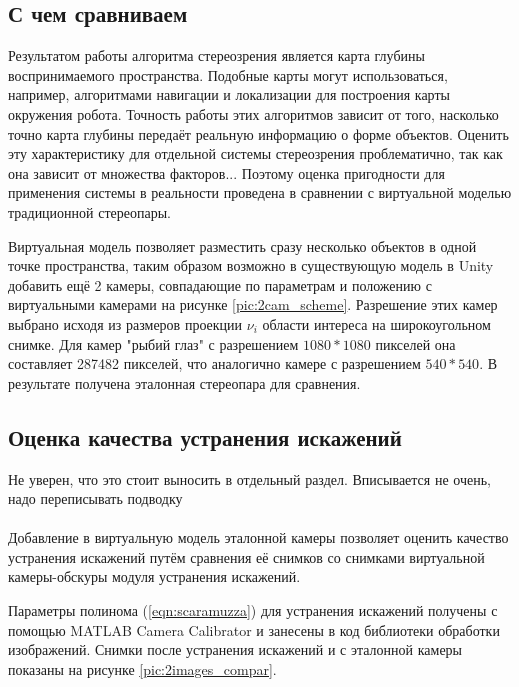 
\subsection{С чем сравниваем}  %

Результатом работы алгоритма стереозрения является карта глубины воспринимаемого пространства. Подобные карты могут
использоваться, например, алгоритмами навигации и локализации для построения карты окружения робота. Точность работы 
этих алгоритмов зависит от того, насколько точно карта глубины передаёт реальную информацию о форме объектов. Оценить 
эту характеристику для отдельной системы стереозрения проблематично, так как она зависит от множества факторов...
Поэтому оценка пригодности для применения системы в реальности проведена в сравнении с виртуальной моделью традиционной
стереопары.

Виртуальная модель позволяет разместить сразу несколько объектов в одной точке пространства, таким образом возможно
в существующую модель в Unity добавить ещё 2 камеры, совпадающие по параметрам и положению с виртуальными камерами на 
рисунке \ref{pic:2cam_scheme}. Разрешение этих камер выбрано исходя из размеров проекции $\nu_i$ области интереса на широкоугольном
снимке. Для камер "рыбий глаз" с разрешением $1080*1080$ пикселей она составляет 287482 пикселей, что аналогично камере 
с разрешением $540*540$.  В результате получена эталонная стереопара для сравнения. %

\subsection{Оценка качества устранения искажений}

Не уверен, что это стоит выносить в отдельный раздел. Вписывается не очень, надо переписывать подводку
\\
\\
Добавление в виртуальную модель эталонной камеры позволяет оценить качество устранения искажений путём сравнения
её снимков со снимками виртуальной камеры-обскуры модуля устранения искажений. %

Параметры полинома (\ref{eqn:scaramuzza}) для устранения искажений получены с помощью MATLAB Camera Calibrator и занесены 
в код библиотеки обработки изображений. %
Снимки после устранения искажений и с эталонной камеры показаны на рисунке \ref{pic:2images_compar}.

